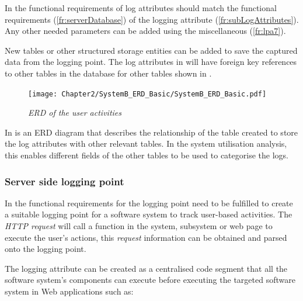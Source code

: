 In  the functional requirements of log attributes should match the functional requirements (\ref{fr:serverDatabase}) of the logging attribute (\ref{fr:subLogAttributes}). Any other needed parameters can be added using the miscellaneous (\ref{fr:lpa7}). \par New tables or other structured storage entities can be added to save the captured data from the logging point. The log attributes in  will have foreign key references to other tables in the database for other tables shown in . 

\begin{figure}[!htb] %
	\centering %
	\texttt{[image: Chapter2/SystemB\_ERD\_Basic/SystemB\_ERD\_Basic.pdf]}
	\caption[ERD of user activities]
	{\textit{ERD of the user activities}}\label{fig:ch2_erdOfEventLogs}
\end{figure}

In  is an ERD diagram that describes the relationship of the table created to store the log attributes with other relevant tables. In the system utilisation analysis, this enables different fields of the other tables to be used to categorise the logs. 

\clearpage

\subsubsection{Server side logging point}\label{sec:ch2_serverSideLoggingpoint}
In  the functional requirements for the logging point need to be fulfilled to create a suitable logging point for a software system to track user-based activities. The \textit{HTTP request} will call a function in the system, subsystem or web page to execute the user's actions, this \textit {request} information can be obtained and parsed onto the logging point.\par The logging attribute can be created as a centralised code segment that all the software system's components can execute before executing the targeted software system in Web applications such as:

